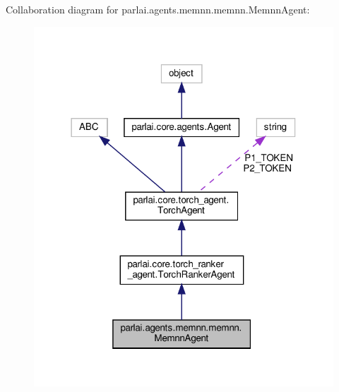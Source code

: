 Collaboration diagram for parlai.\+agents.\+memnn.\+memnn.\+Memnn\+Agent\+:
\nopagebreak
\begin{figure}[H]
\begin{center}
\leavevmode
\includegraphics[width=318pt]{dc/daf/classparlai_1_1agents_1_1memnn_1_1memnn_1_1MemnnAgent__coll__graph}
\end{center}
\end{figure}
